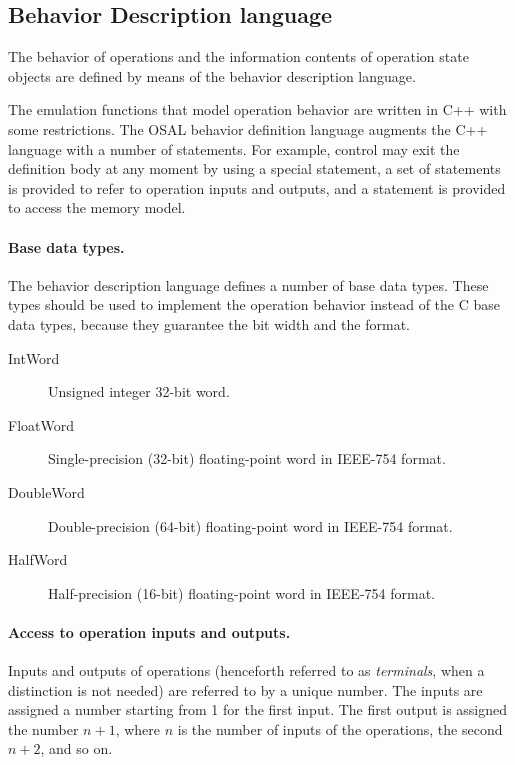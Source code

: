 \documentclass[twoside]{tceusermanual}
\begin{document}
\subsection{Behavior Description language}
\label{ssec:behaviour-commands}

The behavior of operations and the information contents of operation state
objects are defined by means of the behavior description language.

The emulation functions that model operation behavior are written in C++
with some restrictions.
The  OSAL behavior definition
language augments the C++ language with a number of statements.  For
example, 
control may exit the definition body at any moment by using a special 
statement, a set of statements is provided to refer to operation inputs
and 
outputs, and a statement is provided to access the memory model.

\paragraph{Base data types.}
The behavior description language defines a number of base data
types.  These types should be used to implement the operation behavior
instead of the C base data types, because they guarantee the bit width and
the format.
\begin{description}
\item[IntWord] %
  Unsigned integer 32-bit word.
\item[FloatWord] %
  Single-precision (32-bit) floating-point word in IEEE-754 format.
\item[DoubleWord] %
  Double-precision (64-bit) floating-point word in IEEE-754 format.
\item[HalfWord] %
  Half-precision (16-bit) floating-point word in IEEE-754 format.
\end{description}

\paragraph{Access to operation inputs and outputs.}
Inputs and outputs of operations (henceforth referred to as
\emph{terminals}, when a distinction is not needed) are referred to by a
unique number.  The inputs are assigned a number starting from 1 for the
first input.  The first output is assigned the number $n+1$, where $n$ is
the number of inputs of the operations, the second $n+2$, and so on.
\end{document}
